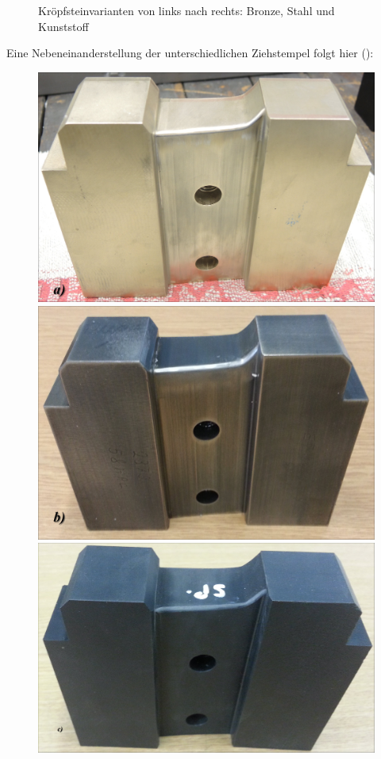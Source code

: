 \documentclass[12pt,a4paper,parskip,twoside,BCOR5mm,headsepline]{scrartcl}
\begin{document}
\begin{description*}
\begin{figure}[H]
\begin{minipage} [t]{0.3115\textwidth}
\end{minipage}
\caption{Kröpfsteinvarianten von links nach rechts: Bronze, Stahl und Kunststoff}
\label{fig:dievar}
\end{figure}


Eine Nebeneinanderstellung der unterschiedlichen Ziehstempel folgt hier (): 


\begin{figure}[H]
\centering
\begin{minipage}[t]{0.3\textwidth}
\includegraphics[width=.9\textwidth]{punchbronze}
\end{minipage}
\begin{minipage}[t]{0.3\textwidth}
\includegraphics[width=.9\textwidth]{punchstahl}
\end{minipage}
\begin{minipage} [t]{0.329\textwidth}
\includegraphics[width=.9\textwidth]{punchkunst}


\end{minipage}
\end{figure}
\end{description*}
\end{document}
